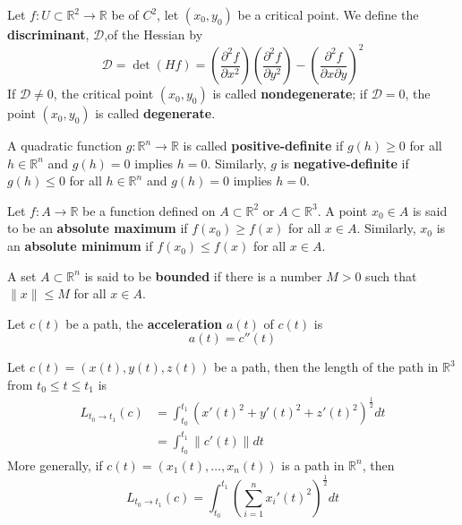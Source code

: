 \documentclass[openany]{book}
\newcommand{\R}{\mathbb{R}}
\begin{document}
\begin{defn}
    Let $f:U\subset\R^2\to\R$ be of $C^2$, let $(x_0,y_0)$ be a critical point. We define the \textbf{discriminant}, \boldmath $\mathcal{D}$,\unboldmath of the Hessian by
    \begin{equation*}
        \mathcal{D}=\det (Hf)=\left(\frac{\partial^2f}{\partial x^2}\right)\left(\frac{\partial^2f}{\partial y^2}\right)-\left(\frac{\partial^2f}{\partial x\partial y}\right)^2
    \end{equation*}
    If $\mathcal{D}\neq 0$, the critical point $(x_0,y_0)$ is called \textbf{nondegenerate}; if $\mathcal{D}=0$, the point $(x_0,y_0)$ is called \textbf{degenerate}.
\end{defn}

\begin{defn}
    A quadratic function $g:\R^n\to\R$ is called \textbf{positive-definite} if $g(h)\geq 0$ for all $h\in\R^n$ and $g(h)=0$ implies $h=0$. Similarly, $g$ is \textbf{negative-definite} if $g(h)\leq 0$ for all $h\in\R^n$ and $g(h)=0$ implies $h=0$. 
\end{defn}


\begin{defn}
    Let $f:A\to\R$ be a function defined on $A\subset\R^2$ or $A\subset\R^3$. A point $x_0\in A$ is said to be an \textbf{absolute maximum} if $f(x_0)\geq f(x)$ for all $x\in A$. Similarly, $x_0$ is an \textbf{absolute minimum} if $f(x_0)\leq f(x)$ for all $x\in A$. 
\end{defn}

\begin{defn}
    A set $A\subset\R^n$ is said to be \textbf{bounded} if there is a number $M>0$ such that $\|x\|\leq M$ for all $x\in A$. 
\end{defn}

\begin{defn}[acceleration]
    Let $c(t)$ be a path, the \textbf{acceleration} $a(t)$ of $c(t)$ is 
    \begin{equation*}
        a(t)=c''(t)
    \end{equation*}
\end{defn}



\begin{defn}
    Let $c(t)=(x(t), y(t), z(t))$ be a path, then the length of the path in $\R^3$ from $t_0\leq t\leq t_1$ is 
    \begin{align*}
        L_{t_0\to t_1}(c)&=\int_{t_0}^{t_1}\left(x'(t)^2+y'(t)^2+z'(t)^2\right)^\frac{1}{2}dt\\
        &=\int_{t_0}^{t_1}\|c'(t)\|dt
    \end{align*}
    More generally, if $c(t)=(x_1(t), \dots, x_n(t))$ is a path in $\R^n$, then 
    \begin{equation*}
        L_{t_0\to t_1}(c)=\int_{t_0}^{t_1}\left(\sum_{i=1}^nx_i'(t)^2\right)^\frac{1}{2}dt
    \end{equation*}
\end{defn}
\end{document}
